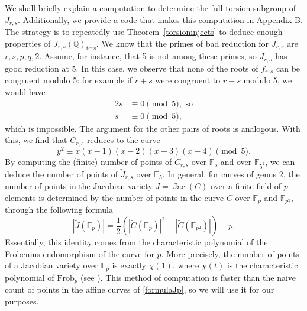 \documentclass[a4paper, 12pt]{amsart}
\theoremstyle{definition}
\theoremstyle{plain}
\theoremstyle{plain}
\theoremstyle{plain}
\theoremstyle{plain}
\theoremstyle{remark}
\theoremstyle{remark}
\theoremstyle{plain}
\newcommand{\thmref}[1]{Theorem~\ref{#1}}
\newcommand{\Q}{\mathbb{Q}}
\DeclareMathOperator{\Jac}{Jac}
\begin{document}
	We shall briefly explain a computation to determine the full torsion subgroup of $J_{r,s}$. Additionally, we provide a code that makes this computation in Appendix B. The strategy is to repeatedly use \thmref{torsioninjects} to deduce enough properties of $J_{r,s}(\Q)_\text{tors}$. We know that the primes of bad reduction for $J_{r,s}$ are $r,s,p,q,2$. Assume, for instance, that 5 is not among these primes, so $J_{r,s}$ has good reduction at 5. In this case, we observe that none of the roots of $f_{r,s}$ can be congruent modulo 5: for example if $r+s$ were congruent to $r-s$ modulo 5, we would have
	\begin{align*}
		2s&\equiv 0\pmod 5, \text{ so}\\
		s&\equiv 0\pmod 5,
	\end{align*}
	which is impossible. The argument for the other pairs of roots is analogous. With this, we find that $C_{r,s}$ reduces to the curve
	\begin{equation*}
		y^2\equiv x(x-1)(x-2)(x-3)(x-4)\pmod 5.
	\end{equation*}
	By computing the (finite) number of points of $\tilde{C}_{r,s}$ over $\mathbb{F}_5$ and over $\mathbb{F}_{5^2}$, we can deduce the number of points of $\tilde{J}_{r,s}$ over $\mathbb{F}_5$. In general, for curves of genus 2, the number of points in the Jacobian variety $J=\Jac(C)$ over a finite field of $p$ elements is determined by the number of points in the curve $C$ over $\mathbb{F}_p$ and $\mathbb{F}_{p^2}$, through the following formula
	\begin{equation}\label{formulaJp}
		|\tilde{J}(\mathbb{F}_p)|=\frac{1}{2}\left(|\tilde{C}(\mathbb{F}_p)|^2+|\tilde{C}(\mathbb{F}_{p^2})|\right)-p.
	\end{equation}
	Essentially, this identity comes from the characteristic polynomial of the Frobenius endomorphism of the curve for $p$. More precisely, the number of points of a Jacobian variety over $\mathbb{F}_p$ is exactly $\chi(1)$, where $\chi(t)$ is the characteristic polynomial of $\text{Frob}_p$ (see \cite{Gaudry_Harley_2000}). This method of computation is faster than the naive count of points in the affine curves of \eqref{formulaJp}, so we will use it for our purposes.
	
\end{document}
